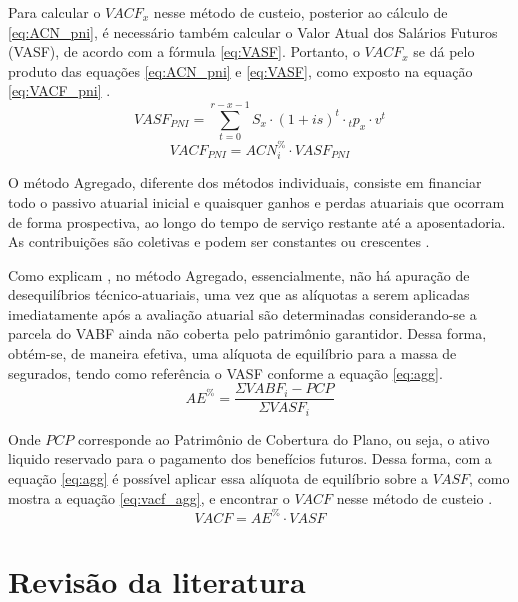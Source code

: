 Para calcular o $VACF_x$ nesse método de custeio, posterior ao cálculo de \ref{eq:ACN_pni}, é necessário também calcular o Valor Atual dos Salários Futuros (VASF), de acordo com a fórmula \ref{eq:VASF}. Portanto, o $VACF_x$ se dá pelo produto das equações \ref{eq:ACN_pni} e \ref{eq:VASF}, como exposto na equação \ref{eq:VACF_pni} \cite{almeidavieira2024}.
\begin{equation}
    VASF_{PNI} = \sum_{t=0}^{r-x-1} S_x\cdot(1+is)^{t} \cdot {}_{t}p_{x} \cdot v^{t}
    \label{eq:VASF}
\end{equation}
\begin{equation}
    VACF_{PNI} = ACN^{\%}_{i} \cdot VASF_{PNI}
    \label{eq:VACF_pni}
\end{equation}

O método Agregado, diferente dos métodos individuais, consiste em financiar todo o passivo atuarial inicial e quaisquer ganhos e perdas atuariais que ocorram de forma prospectiva, ao longo do tempo de serviço restante até a aposentadoria. As contribuições são coletivas e podem ser constantes ou crescentes \cite{andreson1992}.

Como explicam , no método Agregado, essencialmente, não há apuração de desequilíbrios técnico-atuariais, uma vez que as alíquotas a serem aplicadas imediatamente após a avaliação atuarial são determinadas considerando-se a parcela do VABF ainda não coberta pelo patrimônio garantidor. Dessa forma, obtém-se, de maneira efetiva, uma alíquota de equilíbrio para a massa de segurados, tendo como referência o VASF conforme a equação \ref{eq:agg}.
\begin{equation}
    AE^{\%} = \frac{\Sigma VABF_i - PCP}{\Sigma VASF_i}
    \label{eq:agg}
\end{equation}

\noindent Onde $PCP$ corresponde ao Patrimônio de Cobertura do Plano, ou seja, o ativo liquido reservado para o pagamento dos benefícios futuros. Dessa forma, com a equação \ref{eq:agg} é possível aplicar essa alíquota de equilíbrio sobre a $VASF$, como mostra a equação \ref{eq:vacf_agg}, e encontrar o $VACF$ nesse método de custeio \cite{almeidavieira2024}.
\begin{equation}
    VACF = AE^{\%} \cdot VASF
    \label{eq:vacf_agg}
\end{equation}

\section{\textbf{Revisão da literatura}}

